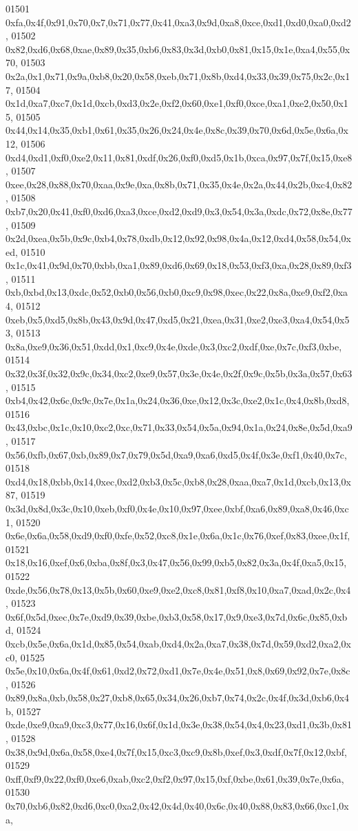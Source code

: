 \begin{DoxyCode}
01501   0xfa,0x4f,0x91,0x70,0x7,0x71,0x77,0x41,0xa3,0x9d,0xa8,0xce,0xd1,0xd0,0xa0,0xd2,
01502   0x82,0xd6,0x68,0xae,0x89,0x35,0xb6,0x83,0x3d,0xb0,0x81,0x15,0x1e,0xa4,0x55,0x70,
01503   0x2a,0x1,0x71,0x9a,0xb8,0x20,0x58,0xeb,0x71,0x8b,0xd4,0x33,0x39,0x75,0x2c,0x17,
01504   0x1d,0xa7,0xc7,0x1d,0xcb,0xd3,0x2e,0xf2,0x60,0xe1,0xf0,0xce,0xa1,0xe2,0x50,0x15,
01505   0x44,0x14,0x35,0xb1,0x61,0x35,0x26,0x24,0x4e,0x8c,0x39,0x70,0x6d,0x5e,0x6a,0x12,
01506   0xd4,0xd1,0xf0,0xe2,0x11,0x81,0xdf,0x26,0xf0,0xd5,0x1b,0xca,0x97,0x7f,0x15,0xe8,
01507   0xee,0x28,0x88,0x70,0xaa,0x9e,0xa,0x8b,0x71,0x35,0x4e,0x2a,0x44,0x2b,0xc4,0x82,
01508   0xb7,0x20,0x41,0xf0,0xd6,0xa3,0xce,0xd2,0xd9,0x3,0x54,0x3a,0xdc,0x72,0x8e,0x77,
01509   0x2d,0xea,0x5b,0x9c,0xb4,0x78,0xdb,0x12,0x92,0x98,0x4a,0x12,0xd4,0x58,0x54,0xed,
01510   0x1c,0x41,0x9d,0x70,0xbb,0xa1,0x89,0xd6,0x69,0x18,0x53,0xf3,0xa,0x28,0x89,0xf3,
01511   0xb,0xbd,0x13,0xdc,0x52,0xb0,0x56,0xb0,0xc9,0x98,0xec,0x22,0x8a,0xe9,0xf2,0xa4,
01512   0xeb,0x5,0xd5,0x8b,0x43,0x9d,0x47,0xd5,0x21,0xea,0x31,0xe2,0xe3,0xa4,0x54,0x53,
01513   0x8a,0xe9,0x36,0x51,0xdd,0x1,0xc9,0x4e,0xde,0x3,0xc2,0xdf,0xe,0x7c,0xf3,0xbe,
01514   0x32,0x3f,0x32,0x9c,0x34,0xc2,0xe9,0x57,0x3e,0x4e,0x2f,0x9c,0x5b,0x3a,0x57,0x63,
01515   0xb4,0x42,0x6c,0x9c,0x7e,0x1a,0x24,0x36,0xe,0x12,0x3c,0xe2,0x1c,0x4,0x8b,0xd8,
01516   0x43,0xbc,0x1c,0x10,0xc2,0xc,0x71,0x33,0x54,0x5a,0x94,0x1a,0x24,0x8e,0x5d,0xa9,
01517   0x56,0xfb,0x67,0xb,0x89,0x7,0x79,0x5d,0xa9,0xa6,0xd5,0x4f,0x3e,0xf1,0x40,0x7c,
01518   0xd4,0x18,0xbb,0x14,0xec,0xd2,0xb3,0x5c,0xb8,0x28,0xaa,0xa7,0x1d,0xcb,0x13,0x87,
01519   0x3d,0x8d,0x3c,0x10,0xeb,0xf0,0x4e,0x10,0x97,0xee,0xbf,0xa6,0x89,0xa8,0x46,0xc1,
01520   0x6e,0x6a,0x58,0xd9,0xf0,0xfe,0x52,0xc8,0x1e,0x6a,0x1c,0x76,0xef,0x83,0xee,0x1f,
01521   0x18,0x16,0xef,0x6,0xba,0x8f,0x3,0x47,0x56,0x99,0xb5,0x82,0x3a,0x4f,0xa5,0x15,
01522   0xde,0x56,0x78,0x13,0x5b,0x60,0xe9,0xe2,0xc8,0x81,0xf8,0x10,0xa7,0xad,0x2c,0x4,
01523   0x6f,0x5d,0xec,0x7e,0xd9,0x39,0xbe,0xb3,0x58,0x17,0x9,0xe3,0x7d,0x6c,0x85,0xbd,
01524   0xcb,0x5e,0x6a,0x1d,0x85,0x54,0xab,0xd4,0x2a,0xa7,0x38,0x7d,0x59,0xd2,0xa2,0xc0,
01525   0x5e,0x10,0x6a,0x4f,0x61,0xd2,0x72,0xd1,0x7e,0x4e,0x51,0x8,0x69,0x92,0x7e,0x8c,
01526   0x89,0x8a,0xb,0x58,0x27,0xb8,0x65,0x34,0x26,0xb7,0x74,0x2c,0x4f,0x3d,0xb6,0x4b,
01527   0xde,0xe9,0xa9,0xc3,0x77,0x16,0x6f,0x1d,0x3e,0x38,0x54,0x4,0x23,0xd1,0x3b,0x81,
01528   0x38,0x9d,0x6a,0x58,0xe4,0x7f,0x15,0xc3,0xc9,0x8b,0xef,0x3,0xdf,0x7f,0x12,0xbf,
01529   0xff,0xf9,0x22,0xf0,0xe6,0xab,0xc2,0xf2,0x97,0x15,0xf,0xbe,0x61,0x39,0x7e,0x6a,
01530   0x70,0xb6,0x82,0xd6,0xc0,0xa2,0x42,0x4d,0x40,0x6c,0x40,0x88,0x83,0x66,0xc1,0xa,

\end{DoxyCode}
